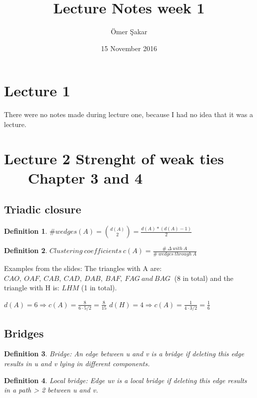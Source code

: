 \documentclass[12pt]{scrartcl}
\title{Lecture Notes week 1}
\author{\"Omer \c Sakar}
\date{15 November 2016}
\newtheorem{defi}{Definition}
\begin{document}
\maketitle
\tableofcontents
\newpage

\section{Lecture 1}
There were no notes made during lecture one, because I had no idea that it was a lecture.


\newpage
\section{Lecture 2 Strenght of weak ties \\ \ \ \ Chapter 3 and 4} 

\subsection{Triadic closure}
\begin{defi}
	$\#wedges(A) = \binom{d(A)}{2} = \frac{d(A)*(d(A)-1)}{2} $
\end{defi}

\begin{defi}
	$Clustering\ coefficients\ c(A) = \frac{\#\ \Delta\ with\ A}{\#\ wedges\ through\ A}$
\end{defi}

\noindent Examples from the slides: \newline
The triangles with A are: $CAO,\ OAF,\ CAB,\ CAD,\ DAB,\ BAF,\ FAG\ and\ BAG\ $ (8 in total) and the triangle with H is: $LHM$ (1 in total).

\noindent $d(A) = 6 \Rightarrow c(A) = \frac{8}{6\cdot 5/2} = \frac{8}{15}$ \newline 
$d(H) = 4 \Rightarrow c(A) = \frac{1}{4\cdot 3/2} = \frac{1}{6}$ \newline


\subsection{Bridges}
\begin{defi}
	Bridge: An edge between u and v is a bridge if deleting this edge results in u and v lying in different components.
\end{defi}
\begin{defi}
	Local bridge: Edge uv is a local bridge if deleting this edge results in a path > 2 between u and v.
\end{defi}
\end{document}

